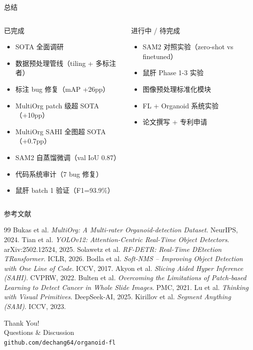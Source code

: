 \documentclass[aspectratio=169, 10pt]{beamer}
\begin{document}
\begin{frame}{总结}
  \begin{columns}[T]
    \begin{block}{已完成}
      \begin{itemize}
        \item[\checkmark] SOTA 全面调研
        \item[\checkmark] 数据预处理管线（tiling + 多标注者）
        \item[\checkmark] 标注 bug 修复（mAP +26pp）
        \item[\checkmark] MultiOrg patch 级超 SOTA（+10pp）
        \item[\checkmark] MultiOrg SAHI 全图超 SOTA（+0.7pp）
        \item[\checkmark] SAM2 自蒸馏微调（val IoU 0.87）
        \item[\checkmark] 代码系统审计（7 bug 修复）
        \item[\checkmark] 鼠肝 batch 1 验证（F1=93.9\%）
      \end{itemize}
    \end{block}
    \begin{block}{进行中 / 待完成}
      \begin{itemize}
        \item[$\circ$] SAM2 对照实验（zero-shot vs finetuned）
        \item[$\circ$] 鼠肝 Phase 1-3 实验
        \item[$\circ$] 图像预处理标准化模块
        \item[$\circ$] FL + Organoid 系统实验
        \item[$\circ$] 论文撰写 + 专利申请
      \end{itemize}
    \end{block}
  \end{columns}
\end{frame}

\begin{frame}[allowframebreaks]{参考文献}
  \footnotesize
  \begin{thebibliography}{99}
     Bukas et al. \textit{MultiOrg: A Multi-rater Organoid-detection Dataset}. NeurIPS, 2024.
     Tian et al. \textit{YOLOv12: Attention-Centric Real-Time Object Detectors}. arXiv:2502.12524, 2025.
     Solawetz et al. \textit{RF-DETR: Real-Time DEtection TRansformer}. ICLR, 2026.
     Bodla et al. \textit{Soft-NMS -- Improving Object Detection with One Line of Code}. ICCV, 2017.
     Akyon et al. \textit{Slicing Aided Hyper Inference (SAHI)}. CVPRW, 2022.
     Bulten et al. \textit{Overcoming the Limitations of Patch-based Learning to Detect Cancer in Whole Slide Images}. PMC, 2021.
     Lu et al. \textit{Thinking with Visual Primitives}. DeepSeek-AI, 2025.
     Kirillov et al. \textit{Segment Anything (SAM)}. ICCV, 2023.
  \end{thebibliography}
\end{frame}

\begin{frame}[plain]
  \centering
  \vfill
  \Large\textcolor{myblue}{Thank You!}\\[0.8em]
  \normalsize Questions \& Discussion\\[1.5em]
  \footnotesize\texttt{github.com/dechang64/organoid-fl}
  \vfill
\end{frame}
\end{document}
